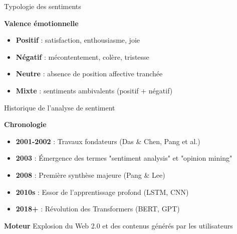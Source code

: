 \begin{frame}{Typologie des sentiments}
    \begin{block}{\centering \textbf{Valence émotionnelle}}
        \begin{itemize}
            \setlength\itemsep{0.6em}
            \item \textbf{Positif} : satisfaction, enthousiasme, joie
            \item \textbf{Négatif} : mécontentement, colère, tristesse  
            \item \textbf{Neutre} : absence de position affective tranchée
            \item \textbf{Mixte} : sentiments ambivalents (positif + négatif)
        \end{itemize}
    \end{block}
    

    
\end{frame}

\begin{frame}{Historique de l'analyse de sentiment}
    \begin{block}{\centering \textbf{Chronologie}}
        \begin{itemize}
            \setlength\itemsep{0.5em}
            \item \textbf{2001-2002} : Travaux fondateurs (Das \& Chen, Pang et al.)
            \item \textbf{2003} : Émergence des termes "sentiment analysis" et "opinion mining"
            \item \textbf{2008} : Première synthèse majeure (Pang \& Lee)
            \item \textbf{2010s} : Essor de l'apprentissage profond (LSTM, CNN)
            \item \textbf{2018+} : Révolution des Transformers (BERT, GPT)
        \end{itemize}
    \end{block}
    
    \vspace{0.3cm}
    
    \begin{alertblock}{\centering \textbf{Moteur}}
        \centering
        Explosion du Web 2.0 et des contenus générés par les utilisateurs
    \end{alertblock}
\end{frame}

